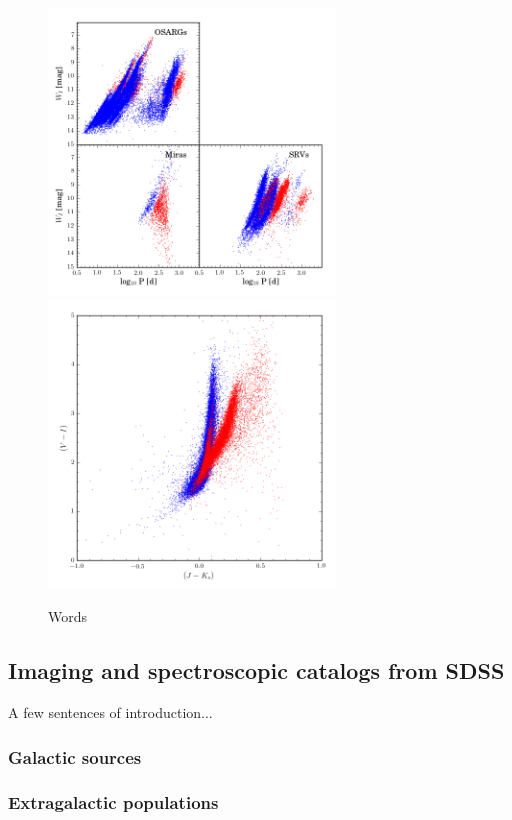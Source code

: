 \begin{figure}[h]
\includegraphics[width=3in]{figs/ogle_2mass_pmag.png}
\includegraphics[width=3in]{figs/ogle_2mass_colcol.png}
\caption{Words \label{fig:oglepmag}}
\end{figure}

\subsection{Imaging and spectroscopic catalogs from SDSS}
A few sentences of introduction...
\subsubsection{Galactic sources} 
\subsubsection{Extragalactic populations} 

